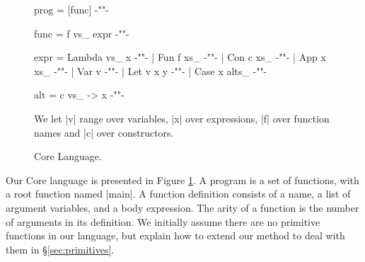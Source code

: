 \documentclass[preprint]{sigplanconf}
\begin{document}
\begin{figure}
\ignore\begin{code}
prog   =  [func]           {-""-}

func   =  f vs_ expr       {-""-}

expr   =  Lambda vs_ x     {-""-}
       |  Fun f xs_        {-""-}
       |  Con c xs_        {-""-}
       |  App x xs_        {-""-}
       |  Var v            {-""-}
       |  Let v x y        {-""-}
       |  Case x alts_     {-""-}

alt    =  c vs_ -> x       {-""-}
\end{code}
\begin{comment}
\begin{code}
data Expr = Lambda [String] Expr
          | Fun String [Expr]
          | Con String [Expr]
          | App Expr [Expr]
          | Var String
          | Case Expr [Alt]
          | Let String Expr Expr

data Alt = Alt String [String] Expr

arity :: String -> Int
body :: String -> Expr
args :: String -> [String]
rhs :: Alt -> Expr
\end{code}
\end{comment}

We let |v| range over variables, |x| over expressions, |f| over function names and |c| over constructors.
\caption{Core Language.}
\label{fig:core}
\end{figure}

Our Core language is presented in Figure \ref{fig:core}. A program is a set of functions, with a root function named |main|. A function definition consists of a name, a list of argument variables, and a body expression. The arity of a function is the number of arguments in its definition. We initially assume there are no primitive functions in our language, but explain how to extend our method to deal with them in \S\ref{sec:primitives}.
\end{document}
